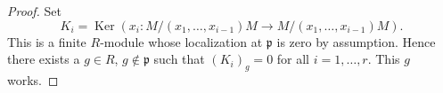 \documentclass[10pt,a4paper]{amsart}
\theoremstyle{plain}
\theoremstyle{definition}
\theoremstyle{remark}
\numberwithin{equation}{subsection}
\def\Ker{\mathop{\mathrm{Ker}}}
\begin{document}
\begin{proof}
Set
$$
K_i = \Ker\left(x_i : M/(x_1, \ldots, x_{i - 1})M \to
M/(x_1, \ldots, x_{i - 1})M\right).
$$
This is a finite $R$-module whose localization at $\mathfrak p$ is
zero by assumption. Hence there exists a $g \in R$, $g \not \in \mathfrak p$
such that $(K_i)_g = 0$ for all $i = 1, \ldots, r$. This $g$ works.
\end{proof}
\end{document}
